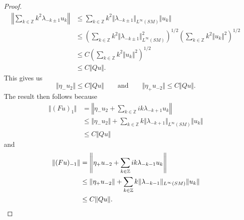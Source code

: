 \documentclass[10pt,a4paper]{amsart}
\newcommand{\Z}{\mathbb{Z}}
\begin{document}
\begin{proof}
\begin{equation*}
\begin{alignedat}{1}
\left\Vert\sum_{k\in \Z}k^2\lambda_{-k\pm 1}u_k \right\Vert & \leq \sum_{k\in \Z}k^2\Vert \lambda_{-k\pm 1}\Vert_{L^\infty(SM)} \Vert u_k\Vert\\
&\leq \left( \sum_{k\in \Z} k^2\Vert \lambda_{-k\pm 1}\Vert_{L^\infty(SM)}^2\right)^{1/2}\left( \sum_{k\in \Z} k^2\Vert u_{k}\Vert^2 \right)^{1/2}\\
&\leq C \left( \sum_{k\in \Z} k^2\Vert u_{k}\Vert^2 \right)^{1/2}\\
&\leq C \Vert Q u \Vert. 
\end{alignedat}
\end{equation*}
This gives us 
$$\Vert \eta_-u_2\Vert \leq C \Vert Qu\Vert\qquad \text{and}\qquad \Vert \eta_+u_{-2}\Vert \leq C \Vert Qu\Vert. $$
The result then follows because
\begin{equation*}
\begin{alignedat}{1}
\Vert (Fu)_1\Vert &= \left\Vert \eta_-u_2 + \sum_{k\in \Z} i k\lambda_{-k+1} u_{k}\right\Vert\\
&\leq \Vert \eta_- u_2\Vert + \sum_{k\in \Z}k\Vert \lambda_{-k+1}\Vert_{L^\infty(SM)} \Vert u_{k}\Vert\\
&\leq C \Vert Qu\Vert
\end{alignedat}
\end{equation*}
and 
\begin{align*}
\Vert (Fu)_{-1}\Vert &= \left\Vert \eta_+u_{-2} + \sum_{k\in \Z} ik\lambda_{-k-1} u_{k}\right\Vert\\
&\leq \Vert \eta_+ u_{-2}\Vert + \sum_{k\in \Z}k\Vert \lambda_{-k-1}\Vert_{L^\infty(SM)}\Vert  u_{k}\Vert\\
&\leq C \Vert Qu\Vert.\qedhere
\end{align*}
\end{proof}
\end{document}
